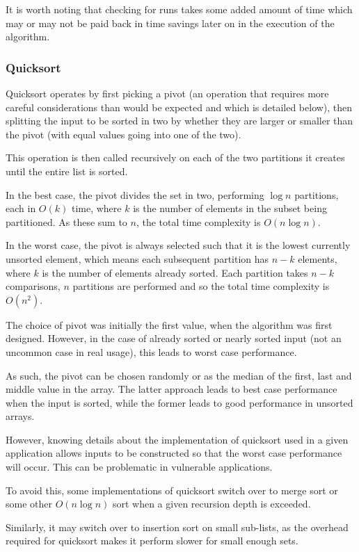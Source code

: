 \documentclass[]{article}
\begin{document}
It is worth noting that checking for runs takes some added amount of time which may or may not be paid back in time savings later on in the execution of the algorithm.

\subsubsection{Quicksort}

Quicksort operates by first picking a pivot (an operation that requires more careful considerations than would be expected and which is detailed below), then splitting the input to be sorted in two by whether they are larger or smaller than the pivot (with equal values going into one of the two).

This operation is then called recursively on each of the two partitions it creates until the entire list is sorted.

In the best case, the pivot divides the set in two, performing $\log{n}$ partitions, each in $O(k)$ time, where $k$ is the number of elements in the subset being partitioned. As these sum to $n$, the total time complexity is $O(n\log{n})$.

In the worst case, the pivot is always selected such that it is the lowest currently unsorted element, which means each subsequent partition has $n-k$ elements, where $k$ is the number of elements already sorted. Each partition takes $n-k$ comparisons, $n$ partitions are performed and so the total time complexity is $O(n^2)$.

The choice of pivot was initially the first value, when the algorithm was first designed. However, in the case of already sorted or nearly sorted input (not an uncommon case in real usage), this leads to worst case performance.

As such, the pivot can be chosen randomly or as the median of the first, last and middle value in the array. The latter approach leads to best case performance when the input is sorted, while the former leads to good performance in unsorted arrays.

However, knowing details about the implementation of quicksort used in a given application allows inputs to be constructed so that the worst case performance will occur. This can be problematic in vulnerable applications.

To avoid this, some implementations of quicksort switch over to merge sort or some other $O(n\log{n})$ sort when a given recursion depth is exceeded.

Similarly, it may switch over to insertion sort on small sub-lists, as the overhead required for quicksort makes it perform slower for small enough sets.
\end{document}
